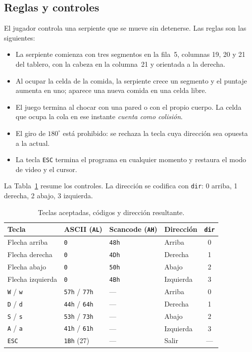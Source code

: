 \documentclass[10pt]{article}
\begin{document}
\subsection{Reglas y controles}
El jugador controla una serpiente que se mueve sin detenerse. Las reglas son las siguientes:
\begin{itemize}[leftmargin=*]
  \item La serpiente comienza con tres segmentos en la fila~5, columnas 19, 20 y 21 del tablero, con la cabeza en la columna~21 y orientada a la derecha.
  \item Al ocupar la celda de la comida, la serpiente crece un segmento y el puntaje aumenta en uno; aparece una nueva comida en una celda libre.
  \item El juego termina al chocar con una pared o con el propio cuerpo. La celda que ocupa la cola en ese instante \emph{cuenta como colisión}.
  \item El giro de $180^\circ$ está prohibido: se rechaza la tecla cuya dirección sea opuesta a la actual.
  \item La tecla \texttt{ESC} termina el programa en cualquier momento y restaura el modo de video y el cursor.
\end{itemize}

La Tabla~\ref{tab:teclas} resume los controles. La dirección se codifica con \texttt{dir}: 0 arriba, 1 derecha, 2 abajo, 3 izquierda.

\begin{table}[ht]
\centering
\caption{Teclas aceptadas, códigos y dirección resultante.}
\label{tab:teclas}
\begin{tabular}{@{}llllc@{}}
\toprule
Tecla & ASCII (\texttt{AL}) & Scancode (\texttt{AH}) & Dirección & \texttt{dir} \\
\midrule
Flecha arriba & \texttt{0} & \texttt{48h} & Arriba & 0 \\
Flecha derecha & \texttt{0} & \texttt{4Dh} & Derecha & 1 \\
Flecha abajo & \texttt{0} & \texttt{50h} & Abajo & 2 \\
Flecha izquierda & \texttt{0} & \texttt{4Bh} & Izquierda & 3 \\
\texttt{W} / \texttt{w} & \texttt{57h} / \texttt{77h} & --- & Arriba & 0 \\
\texttt{D} / \texttt{d} & \texttt{44h} / \texttt{64h} & --- & Derecha & 1 \\
\texttt{S} / \texttt{s} & \texttt{53h} / \texttt{73h} & --- & Abajo & 2 \\
\texttt{A} / \texttt{a} & \texttt{41h} / \texttt{61h} & --- & Izquierda & 3 \\
\texttt{ESC} & \texttt{1Bh} (27) & --- & Salir & --- \\
\bottomrule
\end{tabular}
\end{table}
\end{document}
